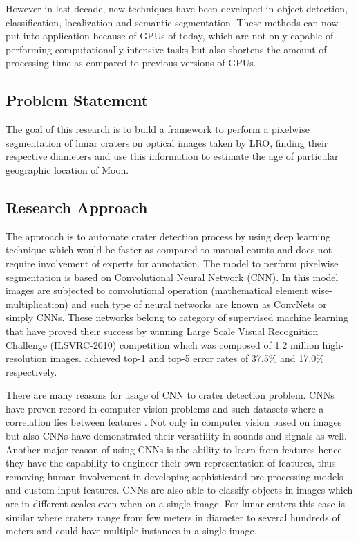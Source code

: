\documentclass[11pt]{article}
\begin{document}
However in last decade, new techniques have been developed in object detection, classification, localization and semantic segmentation. These methods can now put into application because of GPUs of today, which are not only capable of performing computationally intensive tasks but also shortens the amount of processing time as compared to previous versions of GPUs.

\subsection{Problem Statement}
The goal of this research is to build a framework to perform a pixelwise segmentation of lunar craters on optical images taken by LRO, finding their respective diameters and use this information to estimate the age of particular geographic location of Moon.

\subsection{Research Approach}
The approach is to automate crater detection process by using deep learning technique which would be faster as compared to manual counts and does not require involvement of experts for annotation. The model to perform pixelwise segmentation is based on Convolutional Neural Network (CNN). In this model images are subjected to convolutional operation (mathematical element wise-multiplication) and such type of neural networks are known as ConvNets or simply CNNs. These networks belong to category of supervised machine learning that have proved their success by winning Large Scale Visual Recognition Challenge (ILSVRC-2010) competition which was composed of 1.2 million high-resolution images. \cite{krizhevsky2012imagenet} achieved top-1 and top-5 error rates of 37.5\% and 17.0\% respectively.

There are many reasons for usage of CNN to crater detection problem. CNNs have proven record in computer vision problems and such datasets where a correlation lies between features \cite{long2015fully}. Not only in computer vision based on images but also CNNs have demonstrated their versatility in sounds and signals as well. Another major reason of using CNNs is the ability to learn from features hence they have the capability to engineer their own representation of features, thus removing human involvement in developing sophisticated pre-processing models and custom input features. CNNs are also able to classify objects in images which are in different scales even when on a single image. For lunar craters this case is similar where craters range from few meters in diameter to several hundreds of meters and could have multiple instances in a single image.
\end{document}

